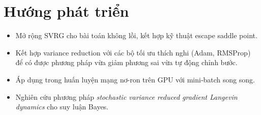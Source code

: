 \documentclass[12pt,a4paper]{report}
\theoremstyle{definition}
\begin{document}
\section{Hướng phát triển}
 \begin{itemize}
    \item Mở rộng SVRG cho bài toán không lồi, kết hợp kỹ thuật escape saddle point.
    \item Kết hợp variance reduction với các bộ tối ưu thích nghi (Adam, RMSProp) để có được phương pháp vừa giảm phương sai vừa tự động chỉnh bước.
    \item Áp dụng trong huấn luyện mạng nơ-ron trên GPU với mini‑batch song song.
    \item Nghiên cứu phương pháp \emph{stochastic variance reduced gradient Langevin dynamics} cho suy luận Bayes.
\end{itemize}



\end{document}
